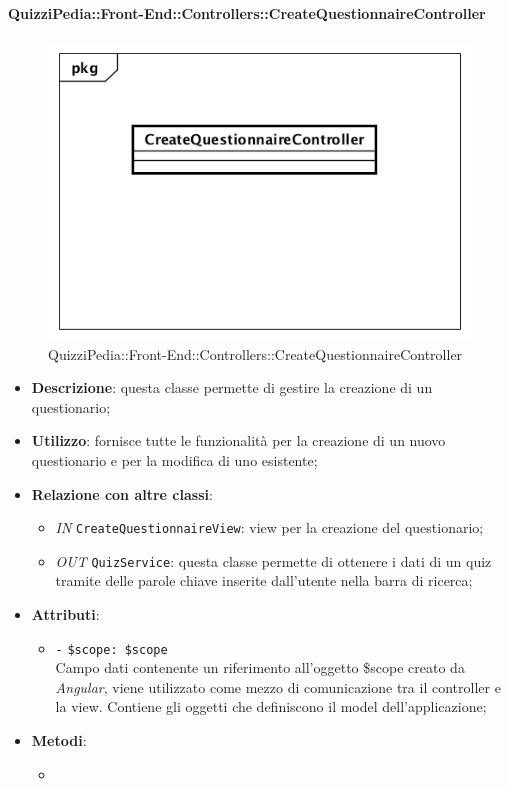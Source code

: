 \paragraph{QuizziPedia::Front-End::Controllers::CreateQuestionnaireController}
\begin{figure}
	\centering
	\includegraphics[scale=0.45]{UML/Classi/Front-End/QuizziPedia_Front-end_Controller_CreateQuestionnaireController.png}
	\caption{QuizziPedia::Front-End::Controllers::CreateQuestionnaireController}
\end{figure}
\begin{itemize}
	\item \textbf{Descrizione}: questa classe permette di gestire la creazione di un questionario;
	\item \textbf{Utilizzo}: fornisce tutte le funzionalità per la creazione di un nuovo questionario e per la modifica di uno esistente;
	\item \textbf{Relazione con altre classi}:
	\begin{itemize}
		\item \textit{IN} \texttt{CreateQuestionnaireView}: view per la creazione del questionario; 
		\item \textit{OUT} \texttt{QuizService}: questa classe permette di ottenere i dati di un quiz tramite delle parole chiave inserite dall'utente nella barra di ricerca;
	\end{itemize}
	\item \textbf{Attributi}:
	\begin{itemize}
		\item \texttt{-} \texttt{\$scope: \$scope} \\
		Campo dati contenente un riferimento all’oggetto \$scope creato da \textit{Angular}, viene utilizzato come mezzo di comunicazione tra il controller e la view. Contiene gli oggetti che definiscono il model dell’applicazione;
	\end{itemize}
	\item \textbf{Metodi}:
	\begin{itemize}
		\item 
	\end{itemize}
\end{itemize}


